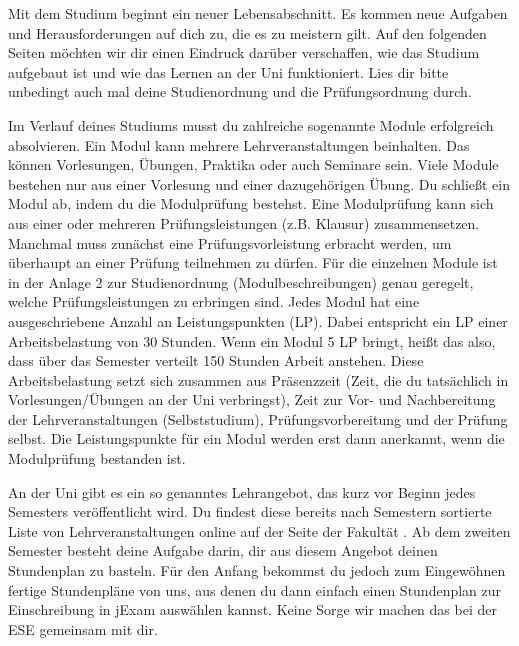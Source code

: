 
Mit dem Studium beginnt ein neuer Lebensabschnitt. Es kommen neue Aufgaben und Herausforderungen auf dich zu, die es zu meistern gilt. Auf den folgenden Seiten möchten
wir dir einen Eindruck darüber verschaffen, wie das Studium aufgebaut ist und wie das Lernen an der Uni funktioniert. Lies dir bitte unbedingt auch mal deine Studienordnung 
und die Prüfungsordnung  durch.

Im Verlauf deines Studiums musst du zahlreiche sogenannte Module erfolgreich absolvieren. Ein Modul kann mehrere Lehrveranstaltungen beinhalten. Das können Vorlesungen,
Übungen, Praktika oder auch Seminare sein. Viele Module bestehen nur aus einer Vorlesung und einer dazugehörigen Übung. Du schließt ein Modul ab, indem du die Modulprüfung
bestehst. Eine Modulprüfung kann sich aus einer oder mehreren Prüfungsleistungen (z.B. Klausur) zusammensetzen. Manchmal muss zunächst eine Prüfungsvorleistung erbracht werden, um
überhaupt an einer Prüfung teilnehmen zu dürfen. Für die einzelnen Module ist in der Anlage 2 zur Studienordnung (Modulbeschreibungen) genau geregelt, welche Prüfungsleistungen zu
erbringen sind.
Jedes Modul hat eine ausgeschriebene Anzahl an Leistungspunkten (LP). Dabei entspricht ein LP einer Arbeitsbelastung von 30 Stunden. Wenn ein Modul 5 LP bringt, heißt das also,
dass über das Semester verteilt 150 Stunden Arbeit anstehen. Diese Arbeitsbelastung setzt sich zusammen aus Präsenzzeit (Zeit, die du tatsächlich in Vorlesungen/Übungen an der Uni verbringst),
Zeit zur Vor- und Nachbereitung der Lehrveranstaltungen (Selbststudium), Prüfungsvorbereitung und der Prüfung selbst. Die Leistungspunkte für ein Modul werden erst dann anerkannt, wenn
die Modulprüfung bestanden ist.


An der Uni gibt es ein so genanntes Lehrangebot, das kurz vor Beginn jedes Semesters veröffentlicht wird.
Du findest diese bereits nach Semestern sortierte Liste von Lehrveranstaltungen online auf der Seite der Fakultät .
Ab dem zweiten Semester besteht deine Aufgabe darin, dir aus diesem Angebot deinen Stundenplan zu basteln.
Für den Anfang bekommst du jedoch zum Eingewöhnen fertige Stundenpläne von uns, aus denen du dann einfach einen Stundenplan zur Einschreibung in jExam auswählen kannst. Keine Sorge wir machen das bei der ESE gemeinsam mit dir.


